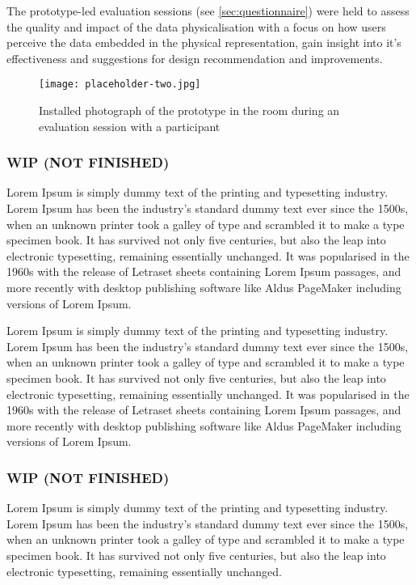 The prototype-led evaluation sessions (see \ref{sec:questionnaire}) were held to assess the quality and impact of the data physicalisation with a focus on how users perceive the data embedded in the physical representation, gain insight into it's effectiveness and suggestions for design recommendation and improvements.

\begin{figure}[b]
    \centering
    \texttt{[image: placeholder-two.jpg]}
    \caption{Installed photograph of the prototype in the room during an evaluation session with a participant }
    \label{fig:complexity}
\end{figure}


\subsubsection{WIP (NOT FINISHED)}

Lorem Ipsum is simply dummy text of the printing and typesetting industry. Lorem Ipsum has been the industry's standard dummy text ever since the 1500s, when an unknown printer took a galley of type and scrambled it to make a type specimen book. It has survived not only five centuries, but also the leap into electronic typesetting, remaining essentially unchanged. It was popularised in the 1960s with the release of Letraset sheets containing Lorem Ipsum passages, and more recently with desktop publishing software like Aldus PageMaker including versions of Lorem Ipsum.

Lorem Ipsum is simply dummy text of the printing and typesetting industry. Lorem Ipsum has been the industry's standard dummy text ever since the 1500s, when an unknown printer took a galley of type and scrambled it to make a type specimen book. It has survived not only five centuries, but also the leap into electronic typesetting, remaining essentially unchanged. It was popularised in the 1960s with the release of Letraset sheets containing Lorem Ipsum passages, and more recently with desktop publishing software like Aldus PageMaker including versions of Lorem Ipsum.


\subsubsection{WIP (NOT FINISHED)}

Lorem Ipsum is simply dummy text of the printing and typesetting industry. Lorem Ipsum has been the industry's standard dummy text ever since the 1500s, when an unknown printer took a galley of type and scrambled it to make a type specimen book. It has survived not only five centuries, but also the leap into electronic typesetting, remaining essentially unchanged.

